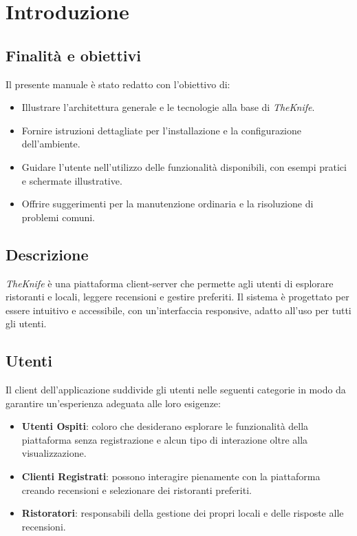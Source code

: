 \section{Introduzione}
\subsection{Finalità e obiettivi}
Il presente manuale è stato redatto con l'obiettivo di:
\begin{itemize}
    \item Illustrare l'architettura generale e le tecnologie alla base di \emph{TheKnife}.
    \item Fornire istruzioni dettagliate per l'installazione e la configurazione dell'ambiente.
    \item Guidare l'utente nell'utilizzo delle funzionalità disponibili, con esempi pratici e schermate illustrative.
    \item Offrire suggerimenti per la manutenzione ordinaria e la risoluzione di problemi comuni.
\end{itemize}

\subsection{Descrizione}
\emph{TheKnife} è una piattaforma client-server che permette agli utenti di esplorare ristoranti e locali, leggere recensioni e gestire preferiti. 
Il sistema è progettato per essere intuitivo e accessibile, 
con un'interfaccia responsive, adatto all'uso per tutti gli utenti.

\subsection{Utenti}
Il client dell'applicazione suddivide gli utenti nelle seguenti 
categorie in modo da garantire un'esperienza adeguata alle loro esigenze:
\begin{itemize}
    \item \textbf{Utenti Ospiti}: coloro che desiderano esplorare 
    le funzionalità della piattaforma senza registrazione e alcun 
    tipo di interazione oltre alla visualizzazione.
    \item \textbf{Clienti Registrati}: possono interagire pienamente con la piattaforma 
    creando recensioni e selezionare dei ristoranti preferiti.
    \item \textbf{Ristoratori}: responsabili della gestione dei propri locali e delle risposte alle recensioni.
\end{itemize}

